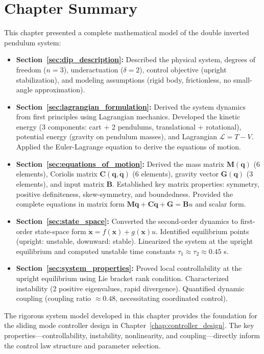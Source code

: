 \section*{Chapter Summary}

This chapter presented a complete mathematical model of the double inverted pendulum system:

\begin{itemize}
\item \textbf{Section~\ref{sec:dip_description}:} Described the physical system, degrees of freedom ($n = 3$), underactuation ($\delta = 2$), control objective (upright stabilization), and modeling assumptions (rigid body, frictionless, no small-angle approximation).

\item \textbf{Section~\ref{sec:lagrangian_formulation}:} Derived the system dynamics from first principles using Lagrangian mechanics. Developed the kinetic energy (3 components: cart + 2 pendulums, translational + rotational), potential energy (gravity on pendulum masses), and Lagrangian $\mathcal{L} = T - V$. Applied the Euler-Lagrange equation to derive the equations of motion.

\item \textbf{Section~\ref{sec:equations_of_motion}:} Derived the mass matrix $\mathbf{M}(\mathbf{q})$ (6 elements), Coriolis matrix $\mathbf{C}(\mathbf{q}, \dot{\mathbf{q}})$ (6 elements), gravity vector $\mathbf{G}(\mathbf{q})$ (3 elements), and input matrix $\mathbf{B}$. Established key matrix properties: symmetry, positive definiteness, skew-symmetry, and boundedness. Provided the complete equations in matrix form $\mathbf{M}\ddot{\mathbf{q}} + \mathbf{C}\dot{\mathbf{q}} + \mathbf{G} = \mathbf{B}u$ and scalar form.

\item \textbf{Section~\ref{sec:state_space}:} Converted the second-order dynamics to first-order state-space form $\dot{\mathbf{x}} = f(\mathbf{x}) + g(\mathbf{x})u$. Identified equilibrium points (upright: unstable, downward: stable). Linearized the system at the upright equilibrium and computed unstable time constants $\tau_1 \approx \tau_2 \approx 0.45$ s.

\item \textbf{Section~\ref{sec:system_properties}:} Proved local controllability at the upright equilibrium using Lie bracket rank condition. Characterized instability (2 positive eigenvalues, rapid divergence). Quantified dynamic coupling (coupling ratio $\approx 0.48$, necessitating coordinated control).
\end{itemize}

The rigorous system model developed in this chapter provides the foundation for the sliding mode controller design in Chapter~\ref{chap:controller_design}. The key properties—controllability, instability, nonlinearity, and coupling—directly inform the control law structure and parameter selection.
